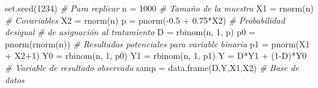 \documentclass[
]{article}
\newenvironment{Shaded}{\begin{snugshade}}{\end{snugshade}}
\newcommand{\CommentTok}[1]{\textcolor[rgb]{0.56,0.35,0.01}{\textit{#1}}}
\newcommand{\DecValTok}[1]{\textcolor[rgb]{0.00,0.00,0.81}{#1}}
\newcommand{\FloatTok}[1]{\textcolor[rgb]{0.00,0.00,0.81}{#1}}
\newcommand{\FunctionTok}[1]{\textcolor[rgb]{0.00,0.00,0.00}{#1}}
\newcommand{\NormalTok}[1]{#1}
\newcommand{\OtherTok}[1]{\textcolor[rgb]{0.56,0.35,0.01}{#1}}
\newcommand{\SpecialCharTok}[1]{\textcolor[rgb]{0.00,0.00,0.00}{#1}}
\begin{document}
\begin{Shaded}
\begin{Highlighting}[]
\FunctionTok{set.seed}\NormalTok{(}\DecValTok{1234}\NormalTok{) }\CommentTok{\# Para replicar }
\NormalTok{n }\OtherTok{=} \DecValTok{1000} \CommentTok{\# Tamaño de la muestra}
\NormalTok{X1 }\OtherTok{=} \FunctionTok{rnorm}\NormalTok{(n) }\CommentTok{\# Covariables}
\NormalTok{X2 }\OtherTok{=} \FunctionTok{rnorm}\NormalTok{(n) }
\NormalTok{p }\OtherTok{=} \FunctionTok{pnorm}\NormalTok{(}\SpecialCharTok{{-}}\FloatTok{0.5} \SpecialCharTok{+} \FloatTok{0.75}\SpecialCharTok{*}\NormalTok{X2) }\CommentTok{\# Probabilidad desigual }
                           \CommentTok{\# de asignación al tratamiento }
\NormalTok{D }\OtherTok{=} \FunctionTok{rbinom}\NormalTok{(n, }\DecValTok{1}\NormalTok{, p) }
\NormalTok{p0 }\OtherTok{=} \FunctionTok{pnorm}\NormalTok{(}\FunctionTok{rnorm}\NormalTok{(n)) }\CommentTok{\# Resultados potenciales para variable binaria}
\NormalTok{p1 }\OtherTok{=} \FunctionTok{pnorm}\NormalTok{(X1 }\SpecialCharTok{+}\NormalTok{ X2}\SpecialCharTok{+}\DecValTok{1}\NormalTok{) }
\NormalTok{Y0 }\OtherTok{=} \FunctionTok{rbinom}\NormalTok{(n, }\DecValTok{1}\NormalTok{, p0) }
\NormalTok{Y1 }\OtherTok{=} \FunctionTok{rbinom}\NormalTok{(n, }\DecValTok{1}\NormalTok{, p1) }
\NormalTok{Y }\OtherTok{=}\NormalTok{ D}\SpecialCharTok{*}\NormalTok{Y1 }\SpecialCharTok{+}\NormalTok{ (}\DecValTok{1}\SpecialCharTok{{-}}\NormalTok{D)}\SpecialCharTok{*}\NormalTok{Y0 }\CommentTok{\#  Variable de resultado observada}
\NormalTok{samp }\OtherTok{=} \FunctionTok{data.frame}\NormalTok{(D,Y,X1,X2) }\CommentTok{\# Base de datos}


\end{Highlighting}
\end{Shaded}
\end{document}
